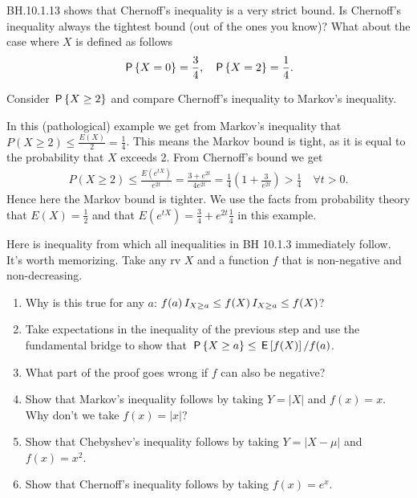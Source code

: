 \begin{exercise}
BH.10.1.13 shows that Chernoff's inequality is a very strict bound.
Is Chernoff's inequality always the tightest bound (out of the ones you know)?
What about the case where $X$ is defined as follows
\begin{align*}
    &\P{X=0} = \frac{3}{4}, & \P{X=2} = \frac{1}{4}.
\end{align*}

\begin{hint}
  Consider $\P{X\geq2}$ and compare Chernoff's inequality to Markov's inequality.
\end{hint}

\begin{solution}
In this (pathological) example we get from Markov's inequality that $P(X\geq 2) \leq \frac{E(X)}{2}=\frac{1}{4}$. This means the Markov bound is tight, as it is equal to the probability that $X$ exceeds 2. From Chernoff's bound we get
\begin{align*}
    P(X\geq 2)\leq \frac{E(e^{t  X})}{e^{2t}} = \frac{3+e^{2t}}{4 e^{2t}} = \frac{1}{4}\left(1+\frac{3}{e^{2t}}\right) > \frac{1}{4}\quad\forall t>0.
\end{align*} Hence here the Markov bound is tighter. We use the facts from probability theory that $E(X)=\frac12$ and that $E(e^{t X})=\frac34+e^{2 t}\frac14$ in this example.
\end{solution}
\end{exercise}

\begin{exercise}
Here is inequality from which all inequalities in BH 10.1.3 immediately follow. It's worth memorizing.
Take any rv $X$ and a function $f$ that is non-negative and non-decreasing.
\begin{enumerate}
\item Why is this true for any $a$: $f(a) \1{X\geq a} \leq f(X) \1{X\geq a} \leq f(X)$?
\item Take expectations in the inequality of the previous step and use the fundamental bridge to show that $\P{X\geq a} \leq \E{f(X)}/f(a)$.
\item What part of the proof goes wrong if  $f$ can also be negative?
\item Show that Markov's inequality follows by taking $Y=|X|$ and  $f(x)=x$. Why don't we take $f(x) = |x|$?
\item Show that Chebyshev's inequality follows by taking $Y=|X-\mu|$ and $f(x)=x^2$.
\item Show that Chernoff's inequality follows by taking $f(x)=e^{x}$.
\end{enumerate}
\end{exercise}




